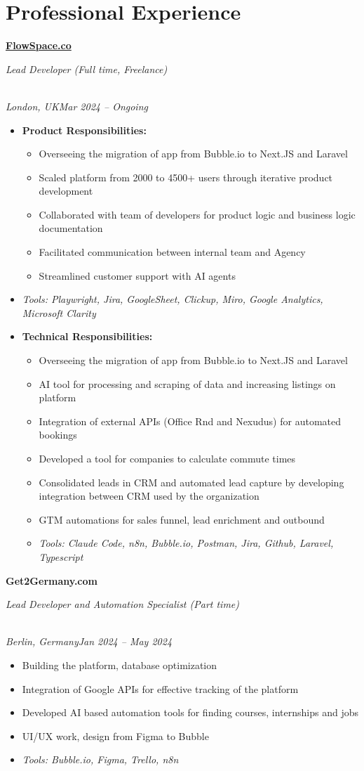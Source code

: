 \documentclass[a4paper,10pt]{article}
\newcommand{\role}[4]{\vspace{3pt}\noindent\hspace{0.6em}\parbox[t]{0.38\textwidth}{\raggedright\textbf{#1}}\hfill\parbox[t]{0.58\textwidth}{\raggedleft\textit{#2}}\\{\textit{#3}\hfill\textit{#4}}\vspace{1pt}}
\begin{document}
\section{Professional Experience}
\role{\href{https://flowspace.co}{FlowSpace.co}}{Lead Developer (Full time, Freelance)}{London, UK}{Mar 2024 -- Ongoing}
\begin{itemize}
\item \textbf{Product Responsibilities:}
\begin{itemize}[label=--]
\item Overseeing the migration of app from Bubble.io to Next.JS and Laravel
\item Scaled platform from 2000 to 4500+ users through iterative product development
\item Collaborated with team of developers for product logic and business logic documentation
\item Facilitated communication between internal team and Agency
\item Streamlined customer support with AI agents
\end{itemize}
\item \textit{Tools: Playwright, Jira, GoogleSheet, Clickup, Miro, Google Analytics, Microsoft Clarity}
\item \textbf{Technical Responsibilities:}
\begin{itemize}[label=--]
\item Overseeing the migration of app from Bubble.io to Next.JS and Laravel
\item AI tool for processing and scraping of data and increasing listings on platform
\item Integration of external APIs (Office Rnd and Nexudus) for automated bookings
\item Developed a tool for companies to calculate commute times
\item Consolidated leads in CRM and automated lead capture by developing integration between CRM used by the organization
\item GTM automations for sales funnel, lead enrichment and outbound
\item \textit{Tools: Claude Code, n8n, Bubble.io, Postman, Jira, Github, Laravel, Typescript}
\end{itemize}
\end{itemize}

\role{Get2Germany.com}{Lead Developer and Automation Specialist (Part time)}{Berlin, Germany}{Jan 2024 -- May 2024}
\begin{itemize}
\item Building the platform, database optimization
\item Integration of Google APIs for effective tracking of the platform
\item Developed AI based automation tools for finding courses, internships and jobs
\item UI/UX work, design from Figma to Bubble
\item \textit{Tools: Bubble.io, Figma, Trello, n8n}
\end{itemize}
\end{document}
